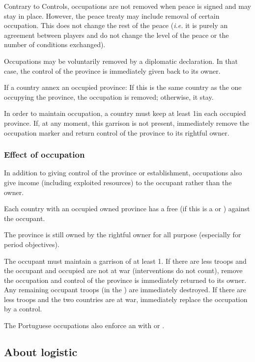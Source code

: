 \aparag Contrary to Controls, occupations are not removed when peace
is signed and may stay in place.
\bparag However, the peace treaty may include removal of certain
occupation. This does not change the rest of the peace (\emph{i.e.} it
is purely an agreement between players and do not change the level of
the peace or the number of conditions exchanged).

\aparag Occupations may be voluntarily removed by a diplomatic
declaration. In that case, the control of the province is immediately
given back to its owner.

\aparag If a country annex an occupied province:
\bparag If this is the same country as the one occupying the province,
the occupation is removed;
\bparag otherwise, it stay.

\aparag In order to maintain occupation, a country must keep at least
1\LD in each occupied province. If, at any moment, this garrison is
not present, immediately remove the occupation marker and return
control of the province to its rightful owner.

\subsubsection{Effect of occupation}
\aparag In addition to giving control of the province or
establishment, occupations also give income (including exploited
resources) to the occupant rather than the owner.

\aparag Each country with an occupied owned province has a free \CB
(\OCB if this is a \COL or \TP) against the occupant.

\aparag The province is still owned by the rightful owner for all \VPs
purpose (especially for period objectives).

\aparag The occupant must maintain a garrison of at least 1\LD.
\bparag If there are less troops and the occupant and occupied are not
at war (interventions do not count), remove the occupation and control
of the province is immediately returned to its owner. Any remaining
occupant troops (\de in the \ROTW) are immediately destroyed.
\bparag If there are less troops and the two countries are at war,
immediately replace the occupation by a control.

\aparag The Portuguese occupations also enforce an \dipAT with
\paysOman or \paysAden.

\subsection{About logistic}

